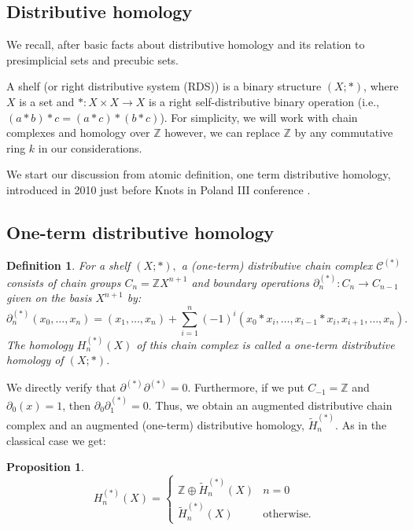 \documentclass[12pt]{amsart}
\newtheorem{definition}[theorem]{Definition}
\newtheorem{proposition}[theorem]{Proposition}
\begin{document}
\subsection{Distributive homology}
We recall, after \cite{Prz8,Prz11} basic facts about distributive homology and its relation to presimplicial sets and precubic sets.

A shelf (or right distributive system (RDS)) is a binary structure $\left( X;\ast \right) $, where $X$ is a set and $\ast :X\times X\rightarrow X$ is a right self-distributive binary operation (i.e., $(a\ast b)\ast c=(a\ast c)\ast (b\ast c)$). For simplicity, we will work with chain complexes and homology over $\mathbb{Z}$ however, we can replace $\mathbb{Z}$ by any commutative ring $k$ in our considerations.

We start our discussion from atomic definition, one term distributive homology,  introduced in 2010 just before Knots in Poland III conference \cite{Prz8}.

\subsection{One-term distributive homology}

\begin{definition}\label{Definition 6.1}
For a shelf $\left( X;\ast \right) ,$ a (one-term)
distributive chain complex $\mathcal{C}^{(\ast )}$ consists of chain groups $%
C_{n}=\mathbb{Z}X^{n+1}$ and boundary operations $\partial _{n}^{(\ast )}:C_{n}\rightarrow
C_{n-1}$ given on the basis $X^{n+1}$ by:
\begin{equation*}
\partial _{n}^{(\ast )}(x_{0},\ldots ,x_{n})=(x_{1},\ldots
,x_{n})+\sum_{i=1}^{n}(-1)^{i}(x_{0}\ast x_{i},\ldots ,x_{i-1}\ast
x_{i},x_{i+1},\ldots ,x_{n}).
\end{equation*}
The homology $H_{n}^{(\ast )}(X)$ of this chain complex is called a \emph{
one-term distributive homology} of $(X;\ast )$.
\end{definition}
We directly verify that $\partial^{(*)}\partial^{(*)}=0$. Furthermore, if we put $C_{-1}=\mathbb{Z}$ and $\partial_{0}(x)=1$, then $\partial_{0}\partial_{1}^{(\ast)}=0$. Thus, we obtain an augmented distributive chain complex and an augmented (one-term) distributive homology, $\widetilde{H}_{n}^{(\ast )}$. As in the classical case we get:
\begin{proposition}\label{Proposition 6.4}
\begin{equation*}
 H_n^{(*)}(X)=
 \begin{cases}
 \mathbb Z \oplus \tilde H^{(*)}_n(X) & n = 0 \\
 \tilde H^{(*)}_n(X) & \text{otherwise.}
 \end{cases}   
\end{equation*}
\end{proposition}
\end{document}
